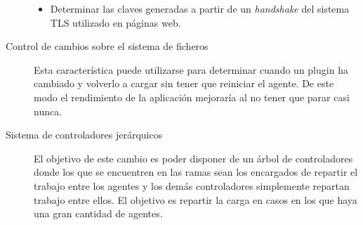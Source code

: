 \begin{description}
\begin{itemize}
		\item Determinar las claves generadas a partir de un \emph{handshake} del sistema TLS utilizado en páginas web.
	\end{itemize}

	\item[Control de cambios sobre el sistema de ficheros] Esta característica puede utilizarse para determinar cuando un plugin ha cambiado y volverlo a cargar sin tener que reiniciar el agente. De este modo el rendimiento de la aplicación mejoraría al no tener que parar casi nunca.
	
	\item[Sistema de controladores jerárquicos] El objetivo de este cambio es poder disponer de un árbol de controladores donde los que se encuentren en las ramas sean los encargados de repartir el trabajo entre los agentes y los demás controladores simplemente repartan trabajo entre ellos. El objetivo es repartir la carga en casos en los que haya una gran cantidad de agentes.
\end{description}